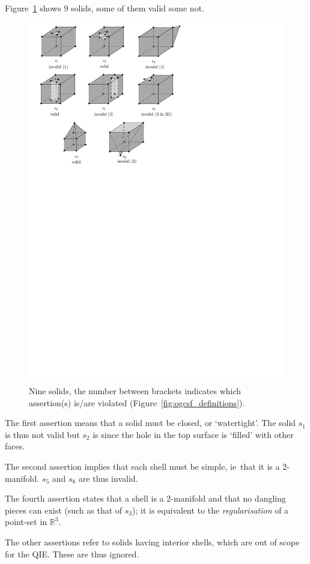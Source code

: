 \documentclass[a4paper,parskip=half,11pt]{scrartcl}
\newcommand{\ie}{ie}
\begin{document}
Figure~\ref{fig:valid3d} shows 9 solids, some of them valid some not.
\begin{figure}
  \centering
  \includegraphics[width=0.85\linewidth]{figs/valid3d.pdf}
  \caption{Nine solids, the number between brackets indicates which assertion(s) is/are violated (Figure~\ref{fig:ogcsf_definitions}).}
\label{fig:valid3d}
\end{figure}

The first assertion means that a solid must be closed, or `watertight'.
The solid $s_1$ is thus not valid but $s_2$ is since the hole in the top surface is `filled' with other faces.

The second assertion implies that each shell must be simple, \ie\ that it is a 2-manifold.
$s_5$ and $s_8$ are thus invalid.

The fourth assertion states that a shell is a 2-manifold and that no dangling pieces can exist (such as that of $s_3$); it is equivalent to the \emph{regularisation} of a point-set in $\mathbb{R}^3$.

The other assertions refer to solids having interior shells, which are out of scope for the QIE\@.
These are thus ignored.






\end{document}
